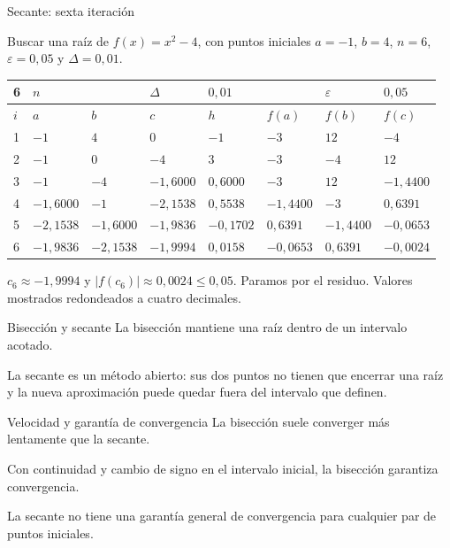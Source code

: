 \documentclass[main.tex]{subfiles}
\begin{document}
\begin{frame}[t]{Secante: sexta iteración}
\begin{minipage}[t][13mm][t]{\textwidth}\small Buscar una raíz de $f(x)=x^2-4$, con puntos iniciales $a=-1$, $b=4$, $n=6$, $\varepsilon=0{,}05$ y $\Delta=0{,}01$.\end{minipage}\par{\scriptsize\setlength{\tabcolsep}{2pt}\renewcommand{\arraystretch}{1}\begin{center}\begin{tabular}{|C{.04\textwidth}|C{.112\textwidth}|C{.112\textwidth}|C{.112\textwidth}|C{.112\textwidth}|C{.112\textwidth}|C{.112\textwidth}|C{.112\textwidth}|}
\hline
\rule{0pt}{4.3mm}6 & $n$ &  &  $\Delta$  & $0{,}01$ &  & $\varepsilon$ & $0{,}05$\\\hline
\rule{0pt}{4.3mm}$i$ & $a$ & $b$ & $c$ & $h$ & $f(a)$ & $f(b)$ & $f(c)$\\\hline
\rule{0pt}{4.3mm}1 & $-1$ & $4$ & $0$ & $-1$ & $-3$ & $12$ & $-4$\\\hline
\rule{0pt}{4.3mm}2 & $-1$ & $0$ & $-4$ & $3$ & $-3$ & $-4$ & $12$\\\hline
\rule{0pt}{4.3mm}3 & $-1$ & $-4$ & $-1{,}6000$ & $0{,}6000$ & $-3$ & $12$ & $-1{,}4400$\\\hline
\rule{0pt}{4.3mm}4 & $-1{,}6000$ & $-1$ & $-2{,}1538$ & $0{,}5538$ & $-1{,}4400$ & $-3$ & $0{,}6391$\\\hline
\rule{0pt}{4.3mm}5 & $-2{,}1538$ & $-1{,}6000$ & $-1{,}9836$ & $-0{,}1702$ & $0{,}6391$ & $-1{,}4400$ & $-0{,}0653$\\\hline
\rule{0pt}{4.3mm}6 & $-1{,}9836$ & $-2{,}1538$ & $-1{,}9994$ & $0{,}0158$ & $-0{,}0653$ & $0{,}6391$ & $-0{,}0024$\\\hline
\end{tabular}\end{center}}\begin{minipage}[t][10mm][t]{\textwidth}\footnotesize $c_6\approx-1{,}9994$ y $|f(c_6)|\approx0{,}0024\le0{,}05$. Paramos por el residuo. Valores mostrados redondeados a cuatro decimales.\end{minipage}
\end{frame}

\begin{frame}{Bisección y secante}
La bisección mantiene una raíz dentro de un intervalo acotado.\par\medskip La secante es un método abierto: sus dos puntos no tienen que encerrar una raíz y la nueva aproximación puede quedar fuera del intervalo que definen.
\end{frame}

\begin{frame}{Velocidad y garantía de convergencia}
La bisección suele converger más lentamente que la secante.\par\medskip Con continuidad y cambio de signo en el intervalo inicial, la bisección garantiza convergencia.\par\medskip La secante no tiene una garantía general de convergencia para cualquier par de puntos iniciales.
\end{frame}
\end{document}
